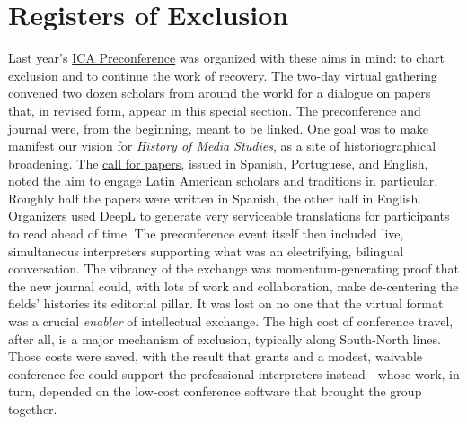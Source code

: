 \documentclass{tufte-handout}
\begin{document}
\hypertarget{registers-of-exclusion}{%
\section{Registers of Exclusion}\label{registers-of-exclusion}}

Last year's \href{https://hms.mediastudies.press/pub/schedule/}{ICA
Preconference} was organized with these aims in mind: to chart exclusion
and to continue the work of recovery. The two-day virtual gathering
convened two dozen scholars from around the world for a dialogue\setcounter{footnote}{49} on
papers that, in revised form, appear in this special section. The
preconference and journal were, from the beginning, meant to be linked.
One goal was to make manifest our vision for \emph{History of Media
Studies}, as a site of historiographical broadening. The
\href{https://hms.mediastudies.press/pub/precon-cfp/}{call for papers},
issued in Spanish, Portuguese, and English, noted the aim to engage
Latin American scholars and traditions in particular. Roughly half the
papers were written in Spanish, the other half in English. Organizers
used DeepL to generate very serviceable translations for participants to
read ahead of time. The preconference event itself then included live,
simultaneous interpreters supporting what was an electrifying, bilingual
conversation. The vibrancy of the exchange was momentum-generating proof
that the new journal could, with lots of work and collaboration, make
de-centering the fields' histories its editorial pillar. It was lost on
no one that the virtual format was a crucial \emph{enabler} of
intellectual exchange. The high cost of conference travel, after all, is
a major mechanism of exclusion, typically along South-North lines. Those
costs were saved, with the result that grants and a modest, waivable
conference fee could support the professional interpreters
instead---whose work, in turn, depended on the low-cost conference
software that brought the group together.
\end{document}
